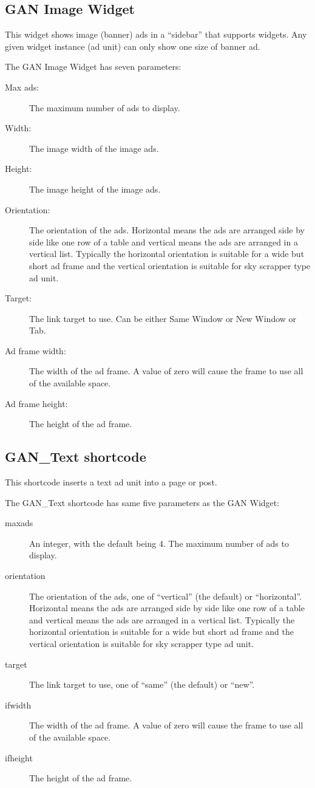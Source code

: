 \documentclass[letterpaper]{article}
\begin{document}
\subsection{GAN Image Widget}

This widget shows image (banner)  ads in a ``sidebar'' that supports
widgets.  Any given widget instance (ad unit) can only show one size of
banner ad.

The GAN Image Widget has seven parameters:
\begin{description}
  \item[Max ads:] The maximum number of ads to display.
  \item[Width:] The image width of the image ads.
  \item[Height:] The image height of the image ads.
  \item[Orientation:] The orientation of the ads. Horizontal
means the ads are arranged side by side like one row of a table and
vertical means the ads are arranged in a vertical list. Typically the
horizontal orientation is suitable for a wide but short ad frame and the
vertical orientation is suitable for sky scrapper type ad unit.
  \item[Target:] The link target to use. Can be either Same 
Window or New Window or Tab.
  \item[Ad frame width:] The width of the ad frame. A value
of zero will cause the frame to use all of the available space.
  \item[Ad frame height:] The height of the ad frame.
\end{description}

\subsection{GAN\_Text shortcode}

This shortcode inserts a text ad unit into a page or post.

The GAN\_Text shortcode has same five parameters as the GAN
Widget:
\begin{description}
  \item[maxads] An integer, with the default being 4.
The maximum number of ads to display.
  \item[orientation] The orientation of the ads, one of
``vertical'' (the default) or ``horizontal''. Horizontal means the ads are
arranged side by side like one row of a table and      vertical means
the ads are arranged in a vertical list. Typically the horizontal
orientation is suitable for a wide but short ad frame and the vertical
orientation is suitable for sky scrapper type ad unit.
  \item[target] The link target to use, one of ``same'' (the
default) or ``new''.
  \item[ifwidth] The width of the ad frame. A value
of zero will cause the frame to use all of the available space.
  \item[ifheight] The height of the ad frame.
\end{description}
\end{document}
